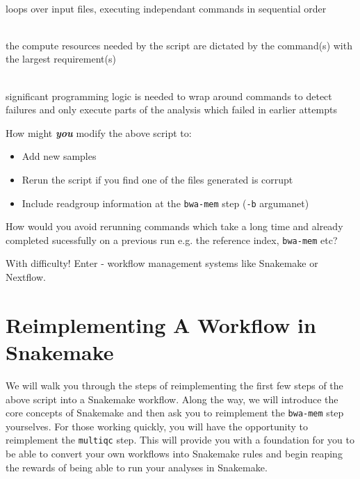 \begin{description}[style=multiline,labelindent=0cm,align=left,leftmargin=0.5cm]
  \item[Not parallelised]\hfill\\
    loops over input files, executing independant commands in sequential order
  \item[Resources over-specified]\hfill\\
    the compute resources needed by the script are dictated by the command(s) with the largest requirement(s)
  \item[Not idempotent]\hfill\\
    significant programming logic is needed to wrap around commands to detect failures and only execute parts of the analysis which failed in earlier attempts
\end{description}

\begin{questions}

How might \emph{\textbf{you}} modify the above script to:

\begin{itemize}
  \item Add new samples
  \item Rerun the script if you find one of the files generated is corrupt
  \item Include readgroup information at the \texttt{bwa-mem} step (\texttt{-b} argumanet)
\end{itemize}

How would you avoid rerunning commands which take a long time and already completed sucessfully
on a previous run e.g. the reference index, \texttt{bwa-mem} etc?

\begin{answer}

With difficulty!
Enter - workflow management systems like Snakemake or Nextflow.

\end{answer}

\end{questions}


\section{Reimplementing A Workflow in Snakemake}

We will walk you through the steps of reimplementing the first few steps of the above script into a Snakemake workflow. Along the way,
we will introduce the core concepts of Snakemake and then ask you to reimplement the \texttt{bwa-mem} step yourselves. For those
working quickly, you will have the opportunity to reimplement the \texttt{multiqc} step. This will provide you with a foundation
for you to be able to convert your own workflows into Snakemake rules and begin reaping the rewards of being able to run your analyses
in Snakemake.

